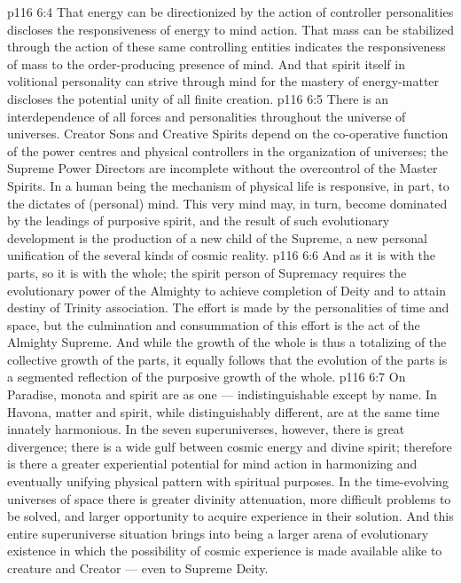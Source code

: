 \vs p116 6:4 \pc That energy can be directionized by the action of controller personalities discloses the responsiveness of energy to mind action. That mass can be stabilized through the action of these same controlling entities indicates the responsiveness of mass to the order\hyp{}producing presence of mind. And that spirit itself in volitional personality can strive through mind for the mastery of energy\hyp{}matter discloses the potential unity of all finite creation.
\vs p116 6:5 There is an interdependence of all forces and personalities throughout the universe of universes. Creator Sons and Creative Spirits depend on the co\hyp{}operative function of the power centres and physical controllers in the organization of universes; the Supreme Power Directors are incomplete without the overcontrol of the Master Spirits. In a human being the mechanism of physical life is responsive, in part, to the dictates of (personal) mind. This very mind may, in turn, become dominated by the leadings of purposive spirit, and the result of such evolutionary development is the production of a new child of the Supreme, a new personal unification of the several kinds of cosmic reality.
\vs p116 6:6 And as it is with the parts, so it is with the whole; the spirit person of Supremacy requires the evolutionary power of the Almighty to achieve completion of Deity and to attain destiny of Trinity association. The effort is made by the personalities of time and space, but the culmination and consummation of this effort is the act of the Almighty Supreme. And while the growth of the whole is thus a totalizing of the collective growth of the parts, it equally follows that the evolution of the parts is a segmented reflection of the purposive growth of the whole.
\vs p116 6:7 On Paradise, monota and spirit are as one --- indistinguishable except by name. In Havona, matter and spirit, while distinguishably different, are at the same time innately harmonious. In the seven superuniverses, however, there is great divergence; there is a wide gulf between cosmic energy and divine spirit; therefore is there a greater experiential potential for mind action in harmonizing and eventually unifying physical pattern with spiritual purposes. In the time\hyp{}evolving universes of space there is greater divinity attenuation, more difficult problems to be solved, and larger opportunity to acquire experience in their solution. And this entire superuniverse situation brings into being a larger arena of evolutionary existence in which the possibility of cosmic experience is made available alike to creature and Creator --- even to Supreme Deity.
